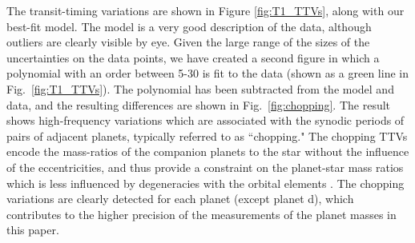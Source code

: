 \documentclass[twocolumn]{aastex63}
\begin{document}
The transit-timing variations are shown in Figure \ref{fig:T1_TTVs}, along
with our best-fit model.  The model is a very good description of the data,
although outliers are clearly visible by eye.  Given the large range of
the sizes of the uncertainties on the data points, we have created a
second figure in which a polynomial with an order between 5-30 is fit to
the data (shown as a green line in Fig.\ \ref{fig:T1_TTVs}).  The polynomial
has been subtracted from the model and data, and the resulting differences 
are shown in Fig.\ \ref{fig:chopping}.  The result shows high-frequency variations which are
associated with the synodic periods of pairs of adjacent planets, typically
referred to as ``chopping."  The chopping TTVs encode the mass-ratios of
the companion planets to the star without the influence of the eccentricities,
and thus provide a constraint on the planet-star mass ratios which is less
influenced by degeneracies with the orbital elements \citep{Deck2015}.  The 
chopping variations are clearly detected for each planet
(except planet d), which contributes to the higher
precision of the measurements of the planet
masses in this paper.
\end{document}
